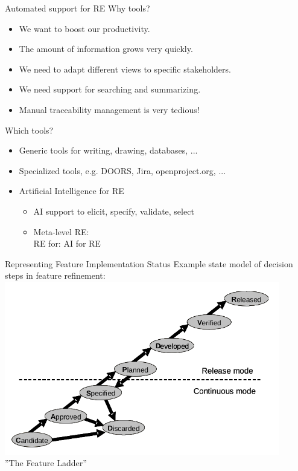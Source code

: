 \documentclass{simpleslides}
\begin{document}
\begin{frame}[fragile]{Automated support for RE}
Why tools?
\begin{itemize}
\item We want to boost our productivity.
\item The amount of information grows very quickly.
\item We need to adapt different views to specific stakeholders.
\item We need support for searching and summarizing.
\item Manual traceability management is very tedious!
\end{itemize}
Which tools?
\begin{itemize}
\item Generic tools for writing, drawing, databases, ...
\item Specialized tools, e.g. DOORS, Jira, openproject.org, ...
\item Artificial Intelligence for RE
\begin{itemize}
\item AI support to elicit, specify, validate, select 
\item Meta-level RE:\\RE for: AI for RE
\end{itemize}
\end{itemize}
\end{frame}

  

\begin{frame}[fragile]{Representing Feature Implementation Status}
Example state model of decision steps in feature refinement:
\includegraphics[width=0.9\textwidth]{img/ladder}
\\''The Feature Ladder''
\end{frame}
\end{document}
